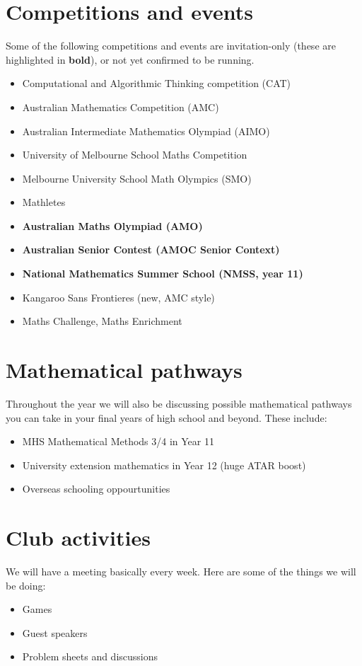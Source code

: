 \documentclass[a4paper,12pt]{extarticle}
\begin{document}
\thispagestyle{empty}
\section*{Competitions and events}
Some of the following competitions and events are invitation-only
(these are highlighted in \textbf{bold}),
or not yet confirmed to be running.
\begin{itemize}

\item Computational and Algorithmic Thinking competition (CAT)
\item Australian Mathematics Competition (AMC)
\item Australian Intermediate Mathematics Olympiad (AIMO)
\item University of Melbourne School Maths Competition
\item Melbourne University School Math Olympics (SMO)
\item Mathletes
\item \textbf{Australian Maths Olympiad (AMO)}
\item \textbf{Australian Senior Contest (AMOC Senior Context)}
\item \textbf{National Mathematics Summer School (NMSS, year 11)}
\item Kangaroo Sans Frontieres (new, AMC style)
\item Maths Challenge, Maths Enrichment
\end{itemize}
\section*{Mathematical pathways}
Throughout the year we will also be discussing possible mathematical
pathways you can take in your final years of high school and beyond.
These include:
\begin{itemize}
\item MHS Mathematical Methods 3/4 in Year 11
\item University extension mathematics in Year 12 (huge ATAR boost)
\item Overseas schooling oppourtunities
\end{itemize}
\section*{Club activities}
We will have a meeting basically every week. Here are some of
the things we will be doing:
\begin{itemize}
\item Games
\item Guest speakers
\item Problem sheets and discussions
\end{itemize}
\end{document}
